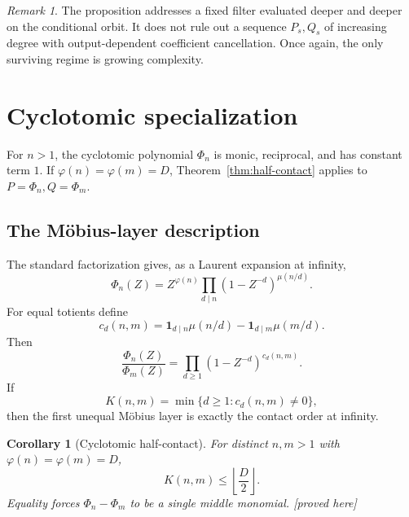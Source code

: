 \documentclass[11pt,oneside]{article}
\newtheorem{corollary}[theorem]{Corollary}
\theoremstyle{definition}
\theoremstyle{remark}
\newtheorem{remark}[theorem]{Remark}
\newcommand{\proved}{\textcolor{deepgreen}{\textsf{[proved here]}}}
\begin{document}
\begin{remark}
The proposition addresses a fixed filter evaluated deeper and deeper on the conditional
orbit.  It does not rule out a sequence $P_s,Q_s$ of increasing degree with output-dependent
coefficient cancellation.  Once again, the only surviving regime is growing complexity.
\end{remark}

\section{Cyclotomic specialization}
\label{sec:cyclotomic}

For $n>1$, the cyclotomic polynomial $\Phi_n$ is monic, reciprocal, and has constant term
$1$.  If $\varphi(n)=\varphi(m)=D$, Theorem~\ref{thm:half-contact} applies to
$P=\Phi_n,Q=\Phi_m$.

\subsection{The M\"obius-layer description}

The standard factorization gives, as a Laurent expansion at infinity,
\begin{equation}
 \Phi_n(Z)=Z^{\varphi(n)}
 \prod_{d\mid n}(1-Z^{-d})^{\mu(n/d)}.
 \label{eq:cyclotomic-infinity}
\end{equation}
For equal totients define
\begin{equation}
 c_d(n,m)=
 \mathbf1_{d\mid n}\mu(n/d)-
 \mathbf1_{d\mid m}\mu(m/d).
 \label{eq:cd}
\end{equation}
Then
\begin{equation}
 \frac{\Phi_n(Z)}{\Phi_m(Z)}
 =\prod_{d\ge1}(1-Z^{-d})^{c_d(n,m)}.
 \label{eq:cyclotomic-ratio}
\end{equation}
If
\begin{equation}
 K(n,m)=\min\{d\ge1:c_d(n,m)\ne0\},
 \label{eq:Knm}
\end{equation}
then the first unequal M\"obius layer is exactly the contact order at infinity.

\begin{corollary}[Cyclotomic half-contact]
\label{cor:cyclotomic-half}
For distinct $n,m>1$ with $\varphi(n)=\varphi(m)=D$,
\begin{equation}
 K(n,m)\le\left\lfloor\frac D2\right\rfloor.
 \label{eq:cyclotomic-half}
\end{equation}
Equality forces
$\Phi_n-\Phi_m$ to be a single middle monomial.  \proved
\end{corollary}
\end{document}
